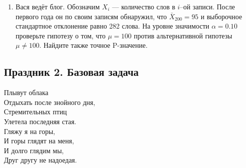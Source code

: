 \documentclass[12pt, a4paper]{article}
\begin{document}
\begin{enumerate}
\item Вася ведёт блог. Обозначим $X_i$ — количество слов в $i$--ой записи. После первого года он по своим записям обнаружил, что $\bar{X}_{200}=95$ и выборочное стандартное отклонение равно 282 слова. На уровне значимости $\alpha=0.10$ проверьте гипотезу о том, что $\mu=100$ против альтернативной гипотезы $\mu\neq 100$. Найдите также точное P-значение.


\end{enumerate}



\subsection{Праздник 2. Базовая задача}



Плывут облака \\
Отдыхать после знойного дня,\\

Стремительных птиц \\
Улетела последняя стая. \\

Гляжу я на горы, \\
И горы глядят на меня, \\

И долго глядим мы,\\
Друг другу не надоедая.\\


\vspace{30pt}
\end{document}
